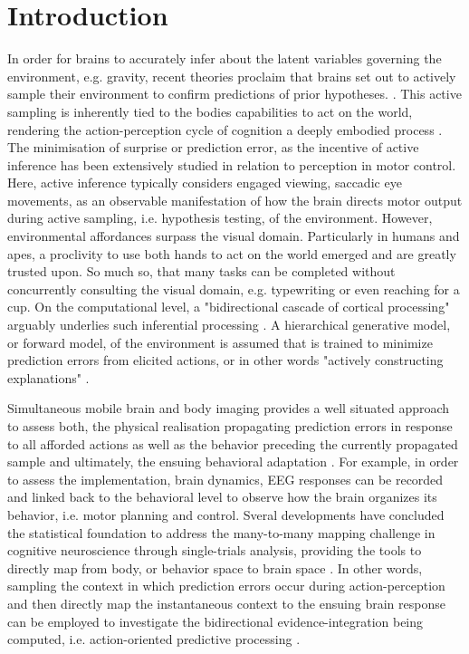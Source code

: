 \section{Introduction}
In order for brains to accurately infer about the latent variables governing the environment, e.g. gravity, recent theories proclaim that brains set out to actively sample their environment to confirm predictions of prior hypotheses. \cites{Clark2013, Friston2010, Rao1999}. This active sampling is inherently tied to the bodies capabilities to act on the world, rendering the action-perception cycle of cognition a deeply embodied process \cite{Friston2012}. The minimisation of surprise or prediction error, as the incentive of active inference has been extensively studied in relation to perception in motor control. Here, active inference typically considers engaged viewing, saccadic eye movements, as an observable manifestation of how the brain directs motor output during active sampling, i.e. hypothesis testing, of the environment. However, environmental affordances surpass the visual domain. Particularly in humans and apes, a proclivity to use both hands to act on the world emerged and are greatly trusted upon. So much so, that many tasks can be completed without concurrently consulting the visual domain, e.g. typewriting or even reaching for a cup. On the computational level, a "bidirectional cascade of cortical processing" arguably underlies such inferential processing \cite{Clark2013}. A hierarchical generative model, or forward model, of the environment is assumed that is trained to minimize prediction errors from elicited actions, or in other words "actively constructing explanations" \cite{Wolpert2011, Friston2018}.

Simultaneous mobile brain and body imaging provides a well situated approach to assess both, the physical realisation propagating prediction errors in response to all afforded actions as well as the behavior preceding the currently propagated sample and ultimately, the ensuing behavioral adaptation \cites{Gramann2014, Makeig2009}. For example, in order to assess the implementation, brain dynamics, EEG responses can be recorded and linked back to the behavioral level to observe how the brain organizes its behavior, i.e. motor planning and control. Sveral developments have concluded the statistical foundation to address the many-to-many mapping challenge in cognitive neuroscience through single-trials analysis, providing the tools to directly map from body, or behavior space to brain space \cites{Pernet2011, Bridwell2018, Friston1994b, Blankertz2011}. In other words, sampling the context in which prediction errors occur during action-perception and then directly map the instantaneous context to the ensuing brain response can be employed to investigate the bidirectional evidence-integration being computed, i.e. action-oriented predictive processing \cite{Clark2013}.